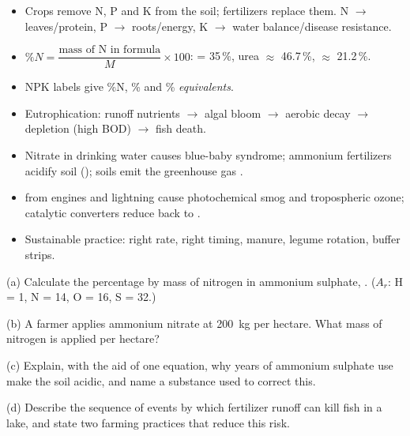 \documentclass[11pt]{article}
\begin{document}
\begin{aretenir}
\begin{itemize}
\item Crops remove N, P and K from the soil; fertilizers replace them. N $\to$ leaves/protein, P $\to$ roots/energy, K $\to$ water balance/disease resistance.
\item $\%N = \dfrac{\text{mass of N in formula}}{M}\times 100$:  = 35\,\%, urea $\approx$ 46.7\,\%,  $\approx$ 21.2\,\%.
\item NPK labels give \%N, \% and \% \emph{equivalents}.
\item Eutrophication: runoff nutrients $\to$ algal bloom $\to$ aerobic decay $\to$  depletion (high BOD) $\to$ fish death.
\item Nitrate in drinking water causes blue-baby syndrome; ammonium fertilizers acidify soil (); soils emit the greenhouse gas .
\item {} from engines and lightning cause photochemical smog and tropospheric ozone; catalytic converters reduce  back to .
\item Sustainable practice: right rate, right timing, manure, legume rotation, buffer strips.
\end{itemize}
\end{aretenir}

\begin{exercice}
(a) Calculate the percentage by mass of nitrogen in ammonium sulphate, . ($A_r$: H = 1, N = 14, O = 16, S = 32.)

(b) A farmer applies ammonium nitrate at \SI{200}{kg} per hectare. What mass of nitrogen is applied per hectare?

(c) Explain, with the aid of one equation, why years of ammonium sulphate use make the soil acidic, and name a substance used to correct this.

(d) Describe the sequence of events by which fertilizer runoff can kill fish in a lake, and state two farming practices that reduce this risk.
\end{exercice}
\end{document}
